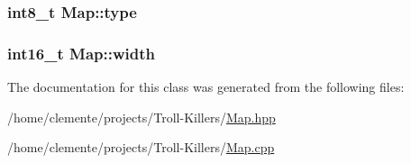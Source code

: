 \subsubsection[{type}]{\setlength{\rightskip}{0pt plus 5cm}int8\+\_\+t Map\+::type\hspace{0.3cm}{\ttfamily [protected]}}\label{class_map_a6e7ba89e3a0a05633ae7d27dd400190f}
\hypertarget{class_map_a15981e529cd48e04432898f9185683d3}{}
\subsubsection[{width}]{\setlength{\rightskip}{0pt plus 5cm}int16\+\_\+t Map\+::width\hspace{0.3cm}{\ttfamily [protected]}}\label{class_map_a15981e529cd48e04432898f9185683d3}


The documentation for this class was generated from the following files\+:\begin{DoxyCompactItemize}
\item 
/home/clemente/projects/\+Troll-\/\+Killers/\hyperlink{_map_8hpp}{Map.\+hpp}\item 
/home/clemente/projects/\+Troll-\/\+Killers/\hyperlink{_map_8cpp}{Map.\+cpp}\end{DoxyCompactItemize}
